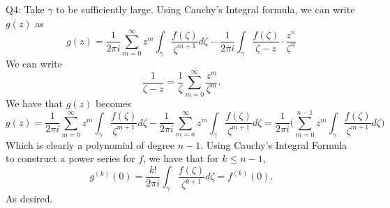 \documentclass[letterpaper]{article}
\begin{document}
\noindent Q4: Take $\gamma$ to be sufficiently large. Using Cauchy's Integral formula, we can write $g(z)$ as 
$$g(z) = \frac{1}{2\pi i} \sum_{m=0}^\infty z^m \int_{\gamma} \frac{f(\zeta)}{\zeta^{m+1}}d\zeta - \frac{1}{2 \pi i} \int_{\gamma} \frac{f(\zeta)}{\zeta-z} \cdot \frac{z^n}{\zeta^n} $$
We can write $$\frac{1}{\zeta - z} = \frac{1}{\zeta} \sum_{m=0}^\infty \frac{z^m}{\zeta^m}.$$
We have that $g(z)$ becomes $$g(z) = \frac{1}{2\pi i} \sum_{m=0}^\infty z^m \int_\gamma \frac{f(\zeta)}{\zeta^{m+1}} d\zeta - \frac{1}{2 \pi i} \sum_{m=n}^\infty z^{m} \int_{\gamma} \frac{f(\zeta)}{\zeta^{m+1}} d\zeta = \frac{1}{2\pi i} \Big( \sum_{m=0}^{n-1}z^{m} \int_{\gamma} \frac{f(\zeta)}{\zeta^{m+1}} d\zeta \Big)$$
Which is clearly a polynomial of degree $n-1$. Using Cauchy's Integral Formula to construct a power series for $f$, we have that for $k \leq n-1$, $$g^{(k)}(0) = \frac{k!}{2\pi i} \int_{\gamma}\frac{f(\zeta)}{\zeta^{k+1}} d \zeta = f^{(k)}(0). $$ As desired. 
\end{document}
